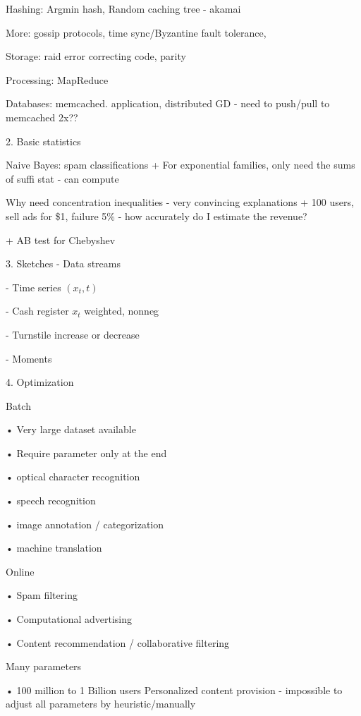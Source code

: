 \documentclass[english]{article}
\begin{document}
 Hashing: Argmin hash, Random caching tree - akamai

 More: gossip protocols, time sync/Byzantine fault tolerance, 
 
\item Storage: raid error correcting code, parity

\item Processing: MapReduce

\item Databases: memcached. application, distributed GD - need to push/pull to memcached 2x??
\eenum 


\item  2. Basic statistics
\benum
\item Naive Bayes: spam classifications
    + For exponential families, only need the sums of suffi stat - can compute
\item Why need concentration inequalities - very convincing explanations
    + 100 users, sell ads for \$1, failure 5\% - how accurately do I estimate the revenue?

    + AB test for Chebyshev
\eenum 

\item  3. Sketches - Data streams

- Time series $(x_t,t)$

- Cash register $x_t$ weighted, nonneg

- Turnstile increase or decrease

-  Moments

\item  4. Optimization
\benum 
\item Batch

• Very large dataset available

• Require parameter only at the end

• optical character recognition

• speech recognition

• image annotation / categorization

• machine translation

\item 
Online


• Spam filtering

• Computational advertising

• Content recommendation / collaborative filtering
\item 
Many parameters

• 100 million to 1 Billion users
Personalized content provision - impossible to
adjust all parameters by heuristic/manually
\end{document}
